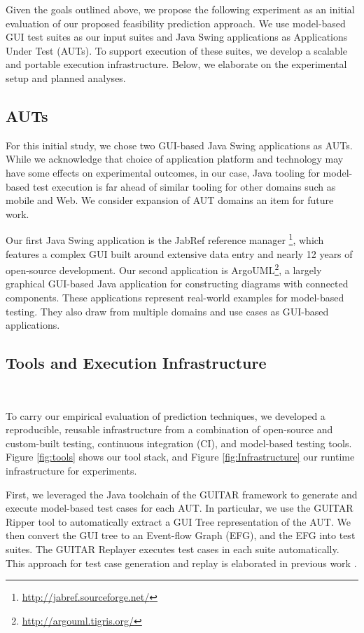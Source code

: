 Given the goals outlined above, we propose the following experiment as an
initial evaluation of our proposed feasibility prediction approach. We use
model-based GUI test suites as our input suites and Java Swing applications as
Applications Under Test (AUTs). To support execution of these suites, we
develop a scalable and portable execution infrastructure. Below, we elaborate
on the experimental setup and planned analyses.

\subsection{AUTs}

For this initial study, we chose two GUI-based Java Swing applications as
AUTs. While we acknowledge that choice of application platform and technology
may have some effects on experimental outcomes, in our case, Java tooling
for model-based test execution is far ahead of similar tooling for other
domains such as mobile and Web. We consider expansion of AUT domains an item
for future work.

Our first Java Swing application is the JabRef reference manager
\footnote{\url{http://jabref.sourceforge.net/}}, which features a complex
GUI built around extensive data entry and nearly 12 years of
open-source development. Our second application is
ArgoUML\footnote{\url{http://argouml.tigris.org/}}, a largely graphical
GUI-based Java application for constructing diagrams with connected
components. These applications represent real-world examples for model-based
testing. They also draw from multiple domains and use cases as GUI-based
applications.

\subsection{Tools and Execution Infrastructure}\





To carry our empirical evaluation of prediction techniques, we developed a reproducible,
reusable infrastructure from a combination of open-source and custom-built testing, continuous
integration (CI), and model-based testing tools. Figure \ref{fig:tools} shows our tool stack, and
Figure \ref{fig:Infrastructure} our runtime infrastructure for experiments.

First, we leveraged the Java toolchain of the GUITAR framework to generate and execute 
model-based test cases for each AUT. In particular, we use the GUITAR Ripper tool to
automatically extract a GUI Tree representation of the AUT. We then convert the GUI tree
to an Event-flow Graph (EFG), and the EFG into test suites. The GUITAR Replayer executes
test cases in each suite automatically. This approach for test case generation and replay is
elaborated in previous work \cite{XXX}.

